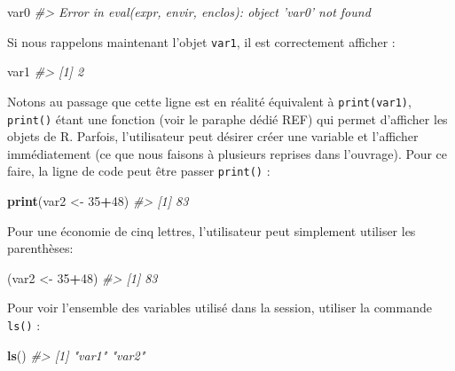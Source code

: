 \documentclass[]{article}
\newenvironment{Shaded}{\begin{snugshade}}{\end{snugshade}}
\newcommand{\CommentTok}[1]{\textcolor[rgb]{0.56,0.35,0.01}{\textit{#1}}}
\newcommand{\DecValTok}[1]{\textcolor[rgb]{0.00,0.00,0.81}{#1}}
\newcommand{\KeywordTok}[1]{\textcolor[rgb]{0.13,0.29,0.53}{\textbf{#1}}}
\newcommand{\NormalTok}[1]{#1}
\newcommand{\OperatorTok}[1]{\textcolor[rgb]{0.81,0.36,0.00}{\textbf{#1}}}
\newcommand{\StringTok}[1]{\textcolor[rgb]{0.31,0.60,0.02}{#1}}
\begin{document}
\begin{Shaded}
\begin{Highlighting}[]
\NormalTok{var0}
\CommentTok{#> Error in eval(expr, envir, enclos): object 'var0' not found}
\end{Highlighting}
\end{Shaded}

Si nous rappelons maintenant l'objet \texttt{var1}, il est correctement afficher :

\begin{Shaded}
\begin{Highlighting}[]
\NormalTok{var1}
\CommentTok{#> [1] 2}
\end{Highlighting}
\end{Shaded}

Notons au passage que cette ligne est en réalité équivalent à \texttt{print(var1)},
\texttt{print()} étant une fonction (voir le paraphe dédié REF) qui permet d'afficher les objets de R. Parfois,
l'utilisateur peut désirer créer une variable et l'afficher immédiatement (ce
que nous faisons à plusieurs reprises dans l'ouvrage). Pour ce faire, la ligne
de code peut être passer \texttt{print()} :

\begin{Shaded}
\begin{Highlighting}[]
\KeywordTok{print}\NormalTok{(var2 <-}\StringTok{ }\DecValTok{35}\OperatorTok{+}\DecValTok{48}\NormalTok{)}
\CommentTok{#> [1] 83}
\end{Highlighting}
\end{Shaded}

Pour une économie de cinq lettres, l'utilisateur peut simplement utiliser les
parenthèses:

\begin{Shaded}
\begin{Highlighting}[]
\NormalTok{(var2 <-}\StringTok{ }\DecValTok{35}\OperatorTok{+}\DecValTok{48}\NormalTok{)}
\CommentTok{#> [1] 83}
\end{Highlighting}
\end{Shaded}

Pour voir l'ensemble des variables utilisé dans la session, utiliser la commande
\texttt{ls()} :

\begin{Shaded}
\begin{Highlighting}[]
\KeywordTok{ls}\NormalTok{()}
\CommentTok{#> [1] "var1" "var2"}
\end{Highlighting}
\end{Shaded}
\end{document}
